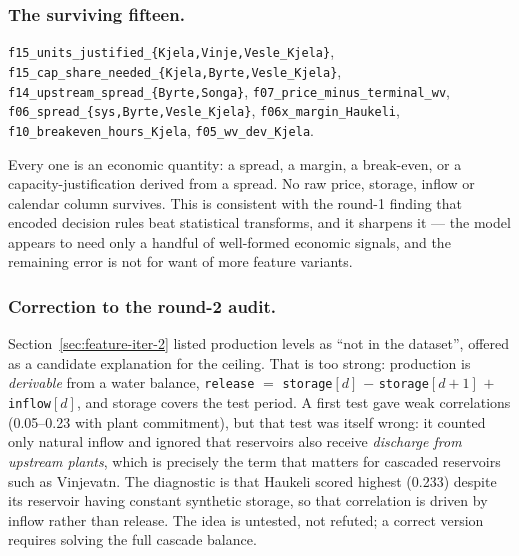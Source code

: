 
\subsubsection*{The surviving fifteen.}
\texttt{f15\_units\_justified\_\{Kjela,\allowbreak Vinje,\allowbreak Vesle\_Kjela\}},
\texttt{f15\_cap\_share\_needed\_\{Kjela,\allowbreak Byrte,\allowbreak Vesle\_Kjela\}},
\texttt{f14\_upstream\_spread\_\{Byrte,Songa\}},
\texttt{f07\_price\_minus\_terminal\_wv},
\texttt{f06\_spread\_\{sys,\allowbreak Byrte,\allowbreak Vesle\_Kjela\}},
\texttt{f06x\_margin\_Haukeli},
\texttt{f10\_breakeven\_hours\_Kjela},
\texttt{f05\_wv\_dev\_Kjela}.

Every one is an economic quantity: a spread, a margin, a break-even, or a capacity-justification
derived from a spread. No raw price, storage, inflow or calendar column survives. This is
consistent with the round-1 finding that encoded decision rules beat statistical transforms, and
it sharpens it --- the model appears to need only a handful of well-formed economic signals, and
the remaining error is not for want of more feature variants.

\subsubsection*{Correction to the round-2 audit.}
Section~\ref{sec:feature-iter-2} listed production levels as ``not in the dataset'', offered as a
candidate explanation for the ceiling. That is too strong: production is \emph{derivable} from a
water balance, \texttt{release} $=$ \texttt{storage}$[d]$ $-$ \texttt{storage}$[d+1]$ $+$
\texttt{inflow}$[d]$, and storage covers the test period. A first test gave weak correlations
(0.05--0.23 with plant commitment), but that test was itself wrong: it counted only natural
inflow and ignored that reservoirs also receive \emph{discharge from upstream plants}, which is
precisely the term that matters for cascaded reservoirs such as Vinjevatn. The diagnostic is that
Haukeli scored highest (0.233) despite its reservoir having constant synthetic storage, so that
correlation is driven by inflow rather than release. The idea is untested, not refuted; a correct
version requires solving the full cascade balance.
